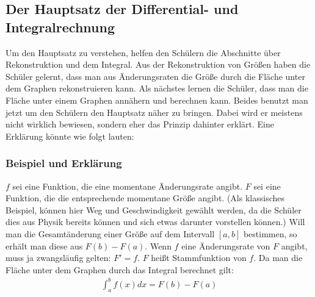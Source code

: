 \documentclass[a4paper]{article}
\begin{document}
\subsection{Der Hauptsatz der Differential- und Integralrechnung}
Um den Hauptsatz zu verstehen, helfen den Schülern die Abschnitte über Rekonstruktion und dem Integral. Aus der Rekonstruktion von Größen haben die Schüler gelernt, dass man aus Änderungsraten die Größe durch die Fläche unter dem Graphen rekonstruieren kann. Als nächstes lernen die Schüler, dass man die Fläche unter einem Graphen annähern und berechnen kann. Beides benutzt man jetzt um den Schülern den Hauptsatz näher zu bringen. Dabei wird er meistens nicht wirklich bewiesen, sondern eher das Prinzip dahinter erklärt. Eine Erklärung könnte wie folgt lauten: 
\subsubsection{Beispiel und Erklärung}
$f$ sei eine Funktion, die eine momentane Änderungsrate angibt. $F$ sei eine Funktion, die die entsprechende momentane Größe angibt. (Als klassisches Beispiel, können hier Weg und Geschwindigkeit gewählt werden, da die Schüler dies aus Physik bereits können und sich etwas darunter vorstellen können.) Will man die Gesamtänderung einer Größe auf dem Intervall $[a,b]$ bestimmen, so erhält man diese aus $F(b) - F(a)$. Wenn $f$ eine Änderungsrate von $F$ angibt, muss ja zwangsläufig gelten: $F' = f$. $F$ heißt Stammfunktion von $f$. Da man die Fläche unter dem Graphen durch das Integral berechnet gilt:
\begin{align*}
\int_a^b f(x) dx = F(b) - F(a)
\end{align*} 
\end{document}
